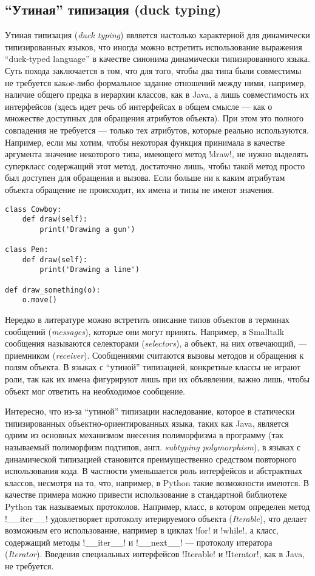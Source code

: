 \subsection{``Утиная'' типизация (duck typing)}

Утиная типизация (\emph{duck typing}) является настолько характерной для динамически
типизированных языков, что иногда можно встретить использование
выражения ``duck-typed language'' в качестве синонима динамически типизированного
языка. Суть похода заключается в том, что для того, чтобы два типа были
совместимы не требуется какoе-либо формальное задание отношений между ними,
например, наличие общего предка в иерархии классов, как в Java, а лишь совместимость их
интерфейсов (здесь идет речь об интерфейсах в общем смысле --- как о множестве
доступных для обращения атрибутов объекта). При этом это полного совпадения не
требуется --- только тех атрибутов, которые реально используются. 
Например, если мы хотим, чтобы некоторая функция принимала в
качестве аргумента значение некоторого типа, имеющего метод !draw!, не нужно
выделять суперкласс содержащий этот метод, достаточно лишь, чтобы такой метод
просто был доступен для обращения и вызова. Если больше ни к каким атрибутам
объекта обращение не происходит, их имена и типы не имеют значения.

\pagebreak
\begin{lstlisting}
class Cowboy:
    def draw(self):
        print('Drawing a gun')

class Pen:
    def draw(self):
        print('Drawing a line')

def draw_something(o):
    o.move()
\end{lstlisting}

Нередко в литературе можно встретить описание типов объектов в терминах
сообщений (\emph{messages}), которые они могут принять. Например, в Smalltalk
сообщения называются селекторами (\emph{selectors}), а объект, на них отвечающий, ---
приемником (\emph{receiver}). Сообщениями считаются вызовы методов и обращения к полям
объекта. В языках с ``утиной'' типизацией, конкретные классы не играют роли, так
как их имена фигурируют лишь при их объявлении, важно лишь, чтобы объект мог
ответить на необходимое сообщение.  

Интересно, что из-за ``утиной'' типизации наследование, которое в статически
типизированных объектно-ориентированных языка, таких как Java, является
одним из основных механизмом внесения полиморфизма в программу (так называемый
полиморфизм подтипов, англ. \emph{subtyping polymorphism}),
в языках с динамической типизацией становится преимущественно средством
повторного использования кода. В частности уменьшается роль интерфейсов и
абстрактных классов, несмотря на то, что, например, в Python такие возможности
имеются. В качестве примера можно привести использование в
стандартной библиотеке Python так называемых протоколов. Например, класс, в
котором определен метод !__iter__! удовлетворяет протоколу
итерируемого объекта (\emph{Iterable}), что делает возможным его использование,
например в циклах !for! и !while!, а класс, содержащий методы
!__iter__! и !__next__! --- протоколу итератора
(\emph{Iterator}).  Введения специальных интерфейсов !Iterable!
и !Iterator!, как в Java, не требуется.

